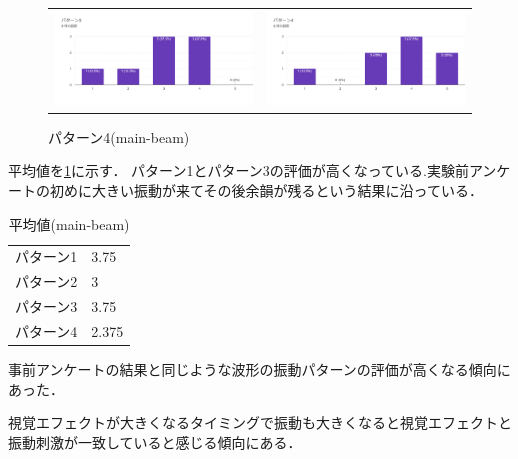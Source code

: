 \begin{figure}[h]
\begin{tabular}{cc}
      \begin{minipage}[t]{0.45\hsize}
        \centering
        \includegraphics[keepaspectratio, scale=0.5]{fig/inceneration3.png}
        \caption{パターン3(main-beam)}
        \label{main3}
      \end{minipage} &
      \begin{minipage}[t]{0.45\hsize}
        \centering
        \includegraphics[keepaspectratio, scale=0.5]{fig/inceneration4.png}
        \caption{パターン4(main-beam)}
        \label{main4}
      \end{minipage} 
    \end{tabular}
  \end{figure}

平均値を\ref{tab;mainAve}に示す．
パターン1とパターン3の評価が高くなっている.実験前アンケートの初めに大きい振動が来てその後余韻が残るという結果に沿っている．

  \begin{table}[H]
    \caption{\label{tab;mainAve}平均値(main-beam)}
    \centering
    \begin{tabular}{l|l}
    \hline
    \hline
    パターン1 & 3.75\\
    パターン2 & 3\\
    パターン3 & 3.75\\
    パターン4 & 2.375\\
    \hline
    \end{tabular}
\end{table}

事前アンケートの結果と同じような波形の振動パターンの評価が高くなる傾向にあった．

視覚エフェクトが大きくなるタイミングで振動も大きくなると視覚エフェクトと振動刺激が一致していると感じる傾向にある．



